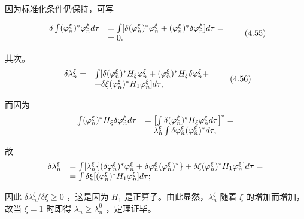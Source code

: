 因为标准化条件仍保持，可写

\begin{equation*}
\begin{array}{r l} \delta \int (\varphi_ {n} ^ {\xi}) ^ {*} \varphi_ {n} ^ {\xi} d \tau & = \int [ \delta (\varphi_ {n} ^ {\xi}) ^ {*} \varphi_ {n} ^ {\xi} + (\varphi_ {n} ^ {\xi}) ^ {*} \delta \varphi_ {n} ^ {\xi} ] d \tau = \\ & = 0. \end{array}\tag{4.55}
\end{equation*}

其次。
\begin{equation*}
\begin{array}{r l} \delta \lambda_ {n} ^ {\xi} = & \int [ \delta (\varphi_ {n} ^ {\xi}) ^ {*} H _ {\xi} \varphi_ {n} ^ {\xi} + (\varphi_ {n} ^ {\xi}) ^ {*} H _ {\xi} \delta \varphi_ {n} ^ {\xi} + \\ & + \delta \xi (\varphi_ {n} ^ {\xi}) ^ {*} H _ {1} \varphi_ {n} ^ {\xi} ] d \tau , \end{array}\tag{4.56}
\end{equation*}

而因为
\begin{equation*}
\begin{array}{r l} \int (\varphi_ {n} ^ {\xi}) ^ {*} H _ {\xi} \delta \varphi_ {n} ^ {\xi} d \tau & = \left[ \int \delta (\varphi_ {n} ^ {\xi}) ^ {*} H _ {\xi} \varphi_ {n} ^ {\xi} d \tau \right] ^ {*} = \\ & = \lambda_ {n} ^ {\xi} \int \delta \varphi_ {n} ^ {\xi} (\varphi_ {n} ^ {\xi}) ^ {*} d \tau , \end{array}
\end{equation*}

故
\begin{equation*}
\begin{array}{r l} \delta \lambda_ {n} ^ {\xi} & = \int [ \lambda_ {n} ^ {\xi} \{(\delta \varphi_ {n} ^ {\xi}) ^ {*} \varphi_ {n} ^ {\xi} + \delta \varphi_ {n} ^ {\xi} (\varphi_ {n} ^ {\xi}) ^ {*} \} + \delta \xi (\varphi_ {n} ^ {\xi}) ^ {*} H _ {1} \varphi_ {n} ^ {\xi} ] d \tau = \\ & = \int \delta \xi [ (\varphi_ {n} ^ {\xi}) ^ {*} H _ {1} \varphi_ {n} ^ {\xi} ] d \tau ; \end{array}
\end{equation*}

因此 $\delta \lambda_{n}^{\xi} / \delta \xi \geqslant 0$ ，这是因为 $H_{1}$ 是正算子。由此显然，$\lambda_{n}^{\xi}$ 随着 $\xi$ 的增加而增加，故当 $\xi = 1$ 时即得 $\lambda_{n} \geqslant \lambda_{n}^{0}$ ，定理证毕。

